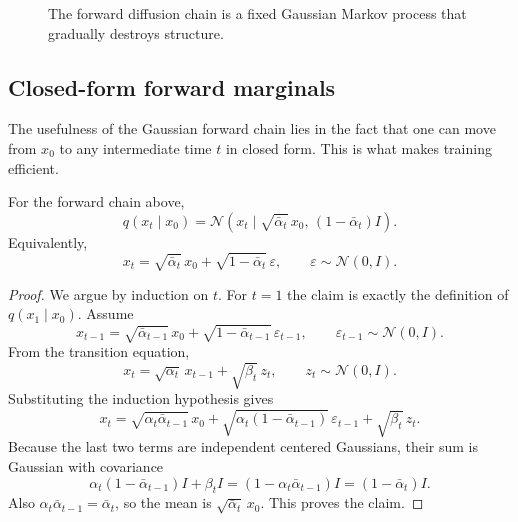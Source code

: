 \begin{figure}[h]
\centering
{}
\caption{The forward diffusion chain is a fixed Gaussian Markov process that gradually destroys structure.}
\end{figure}

\subsection*{Closed-form forward marginals}

The usefulness of the Gaussian forward chain lies in the fact that one can move from $x_0$ to any intermediate time $t$ in closed form.
This is what makes training efficient.

\begin{proposition}
For the forward chain above,
\[
q(x_t\mid x_0)
=
\mathcal{N}\!\left(x_t\mid \sqrt{\bar\alpha_t}\,x_0,\, (1-\bar\alpha_t)I\right).
\]
Equivalently,
\[
x_t = \sqrt{\bar\alpha_t}\,x_0 + \sqrt{1-\bar\alpha_t}\,\varepsilon,
\qquad \varepsilon\sim \mathcal{N}(0,I).
\]
\end{proposition}

\begin{proof}
We argue by induction on $t$.
For $t=1$ the claim is exactly the definition of $q(x_1\mid x_0)$.
Assume
\[
x_{t-1}=\sqrt{\bar\alpha_{t-1}}\,x_0 + \sqrt{1-\bar\alpha_{t-1}}\,\varepsilon_{t-1},
\qquad \varepsilon_{t-1}\sim \mathcal{N}(0,I).
\]
From the transition equation,
\[
x_t = \sqrt{\alpha_t}\,x_{t-1} + \sqrt{\beta_t}\,z_t,
\qquad z_t\sim\mathcal{N}(0,I).
\]
Substituting the induction hypothesis gives
\[
x_t = \sqrt{\alpha_t\bar\alpha_{t-1}}\,x_0
+ \sqrt{\alpha_t(1-\bar\alpha_{t-1})}\,\varepsilon_{t-1}
+ \sqrt{\beta_t}\,z_t.
\]
Because the last two terms are independent centered Gaussians, their sum is Gaussian with covariance
\[
\alpha_t(1-\bar\alpha_{t-1})I + \beta_t I
=
(1-\alpha_t\bar\alpha_{t-1})I
=
(1-\bar\alpha_t)I.
\]
Also $\alpha_t\bar\alpha_{t-1}=\bar\alpha_t$, so the mean is $\sqrt{\bar\alpha_t}\,x_0$.
This proves the claim.
\end{proof}

